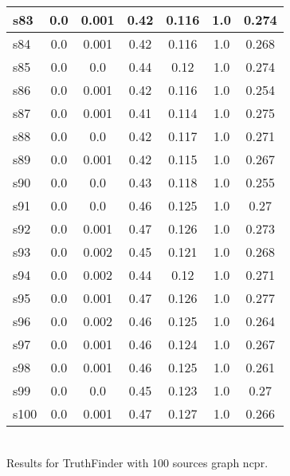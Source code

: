 \documentclass{article}
\begin{document}
\begin{tabular}{|l|c|c|c|c|c|c|}
\hline
s83 &0.0 & 0.001 & 0.42 & 0.116 & 1.0 & 0.274\\
\hline
s84 &0.0 & 0.001 & 0.42 & 0.116 & 1.0 & 0.268\\
\hline
s85 &0.0 & 0.0 & 0.44 & 0.12 & 1.0 & 0.274\\
\hline
s86 &0.0 & 0.001 & 0.42 & 0.116 & 1.0 & 0.254\\
\hline
s87 &0.0 & 0.001 & 0.41 & 0.114 & 1.0 & 0.275\\
\hline
s88 &0.0 & 0.0 & 0.42 & 0.117 & 1.0 & 0.271\\
\hline
s89 &0.0 & 0.001 & 0.42 & 0.115 & 1.0 & 0.267\\
\hline
s90 &0.0 & 0.0 & 0.43 & 0.118 & 1.0 & 0.255\\
\hline
s91 &0.0 & 0.0 & 0.46 & 0.125 & 1.0 & 0.27\\
\hline
s92 &0.0 & 0.001 & 0.47 & 0.126 & 1.0 & 0.273\\
\hline
s93 &0.0 & 0.002 & 0.45 & 0.121 & 1.0 & 0.268\\
\hline
s94 &0.0 & 0.002 & 0.44 & 0.12 & 1.0 & 0.271\\
\hline
s95 &0.0 & 0.001 & 0.47 & 0.126 & 1.0 & 0.277\\
\hline
s96 &0.0 & 0.002 & 0.46 & 0.125 & 1.0 & 0.264\\
\hline
s97 &0.0 & 0.001 & 0.46 & 0.124 & 1.0 & 0.267\\
\hline
s98 &0.0 & 0.001 & 0.46 & 0.125 & 1.0 & 0.261\\
\hline
s99 &0.0 & 0.0 & 0.45 & 0.123 & 1.0 & 0.27\\
\hline
s100 &0.0 & 0.001 & 0.47 & 0.127 & 1.0 & 0.266\\
\hline
\end{tabular}\\

\noindent Results for TruthFinder with 100 sources graph ncpr.
\end{document}
